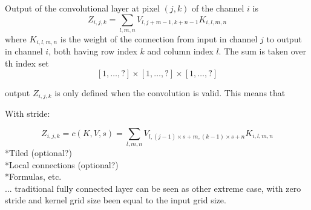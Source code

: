 \documentclass[]{article}
\begin{document}
Output of the convolutional layer at pixel $(j, k)$ of the channel $i$ is
\[
Z_{i, j, k} = \sum_{l, m, n} V_{l, j + m -1, k + n -1} K_{i, l, m, n}
\]
where $K_{i, l, m, n}$ is the weight of the connection from input in channel $j$
to output in channel $i$, both having row index $k$ and column index $l$. The sum
is taken over th index set
\[
[1, \ldots, ?] \times  [1, \ldots, ?] \times [1, \ldots, ?]
\]


 output
$Z_{i, j, k}$ is only defined when the convolution is valid. This means that


With stride:

\[
Z_{i, j, k} = c(K, V, s) =
\sum_{l, m, n} V_{l, (j -1)\times s + m, (k-1)\times s + n} K_{i, l, m, n}
\]
*Tiled (optional?)\\
*Local connections (optional?)\\
*Formulas, etc.\\
... traditional fully connected layer can be seen
as other extreme case, with zero stride and kernel grid size been equal to the
input grid size.

%
%
%
%
%
%
%
%
\end{document}
